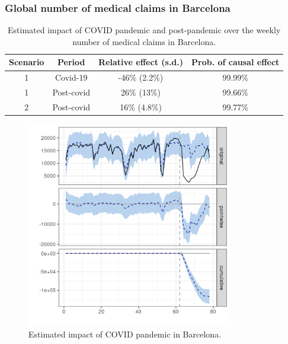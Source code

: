 \documentclass[9pt]{osa-supplemental-document}
\begin{document}
\subsubsection{Global number of medical claims in Barcelona}\label{bcn}
\begin{table}[H]\caption{Estimated impact of COVID pandemic and post-pandemic over the weekly number of medical claims in Barcelona.}
  \centering  
  \begin{tabular}{ |c|c|c|c| }
      \hline
   \textbf{Scenario} & \textbf{Period} & \textbf{Relative effect (s.d.)} & \textbf{Prob. of causal effect} \\ 
   \hline
   1 & Covid-19 & -46\% (2.2\%) & 99.99\% \\  
   1 & Post-covid & 26\% (13\%) &  99.66\% \\
   \hline   
   2 & Post-covid & 16\% (4.8\%) & 99.77\% \\
   \hline
  \end{tabular}
\end{table}

\begin{center}
  \begin{figure}[H]
    \includegraphics[width=9cm]{global_covid_Barcelona.png}\caption{Estimated impact of COVID pandemic in Barcelona.}
  \end{figure}
  \end{center}
  
\end{document}
